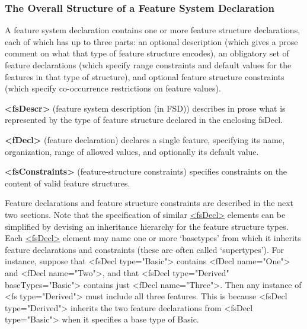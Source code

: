 \subsubsection[{The Overall Structure of a Feature System Declaration}]{The Overall Structure of a Feature System Declaration}\label{FDOV}\par
A feature system declaration contains one or more feature structure declarations, each of which has up to three parts: an optional description (which gives a prose comment on what that type of feature structure encodes), an obligatory set of feature declarations (which specify range constraints and default values for the features in that type of structure), and optional feature structure constraints (which specify co-occurrence restrictions on feature values). 
\begin{sansreflist}
  
\item [\textbf{<fsDescr>}] (feature system description (in FSD)) describes in prose what is represented by the type of feature structure declared in the enclosing fsDecl.
\item [\textbf{<fDecl>}] (feature declaration) declares a single feature, specifying its name, organization, range of allowed values, and optionally its default value.
\item [\textbf{<fsConstraints>}] (feature-structure constraints) specifies constraints on the content of valid feature structures.
\end{sansreflist}
\par
Feature declarations and feature structure constraints are described in the next two sections. Note that the specification of similar \hyperref[TEI.fsDecl]{<fsDecl>} elements can be simplified by devising an inheritance hierarchy for the feature structure types. Each \hyperref[TEI.fsDecl]{<fsDecl>} element may name one or more ‘basetypes’ from which it inherits feature declarations and constraints (these are often called ‘supertypes’). For instance, suppose that <fsDecl type="Basic"> contains <fDecl name="One"> and <fDecl name="Two">, and that <fsDecl type="Derived" baseTypes="Basic"> contains just <fDecl name="Three">. Then any instance of <fs type="Derived"> must include all three features. This is because <fsDecl type="Derived"> inherits the two feature declarations from <fsDecl type="Basic"> when it specifies a base type of Basic.\par
